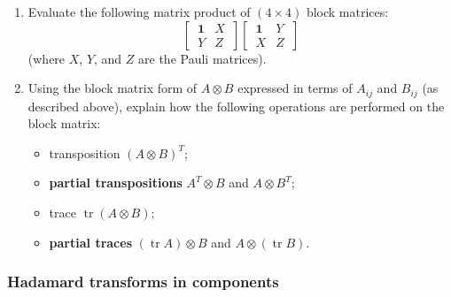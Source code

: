 \documentclass[fleqn]{article}
\providecommand{\tightlist}{%
  \setlength{\itemsep}{0pt}\setlength{\parskip}{0pt}}
\begin{document}
\begin{enumerate}
\def\labelenumi{\arabic{enumi}.}
\item
  Evaluate the following matrix product of \((4\times 4)\) block matrices:
  \[
     \left[
     \,
       \begin{array}{c|c}
         \mathbf{1}& X
       \\\hline
         Y & Z
       \end{array}
     \,
     \right]
     \left[
     \,
       \begin{array}{c|c}
         \mathbf{1}& Y
       \\\hline
         X & Z
       \end{array}
     \,
     \right]
   \]
  (where \(X\), \(Y\), and \(Z\) are the Pauli matrices).
\item
  Using the block matrix form of \(A\otimes B\) expressed in terms of \(A_{ij}\) and \(B_{ij}\) (as described above), explain how the following operations are performed on the block matrix:

  \begin{itemize}
  \tightlist
  \item
    transposition \((A\otimes B)^T\);
  \item
    \textbf{partial transpositions} \(A^T\otimes B\) and \(A\otimes B^T\);
  \item
    trace \(\operatorname{tr}(A\otimes B)\);
  \item
    \textbf{partial traces} \((\operatorname{tr}A)\otimes B\) and \(A\otimes(\operatorname{tr}B)\).
  \end{itemize}
\end{enumerate}

\hypertarget{hadamard-transforms-in-components}{%
\subsubsection{Hadamard transforms in components}\label{hadamard-transforms-in-components}}
\end{document}
